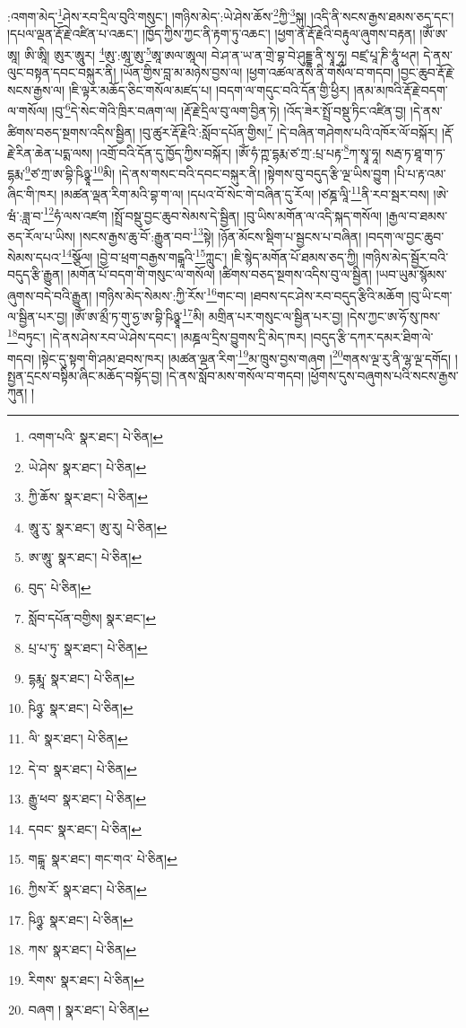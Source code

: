 :འགག་མེད་\footnote{འགག་པའི་  སྣར་ཐང་།  པེ་ཅིན། }ཤེས་རབ་དྲིལ་བུའི་གསུང་། །གཉིས་མེད་:ཡེ་ཤེས་ཆོས་\footnote{ཡེ་ཤེས་  སྣར་ཐང་།  པེ་ཅིན། }ཀྱི་\footnote{ཀྱི་ཆོས་  སྣར་ཐང་།  པེ་ཅིན། }སྐུ། །འདི་ནི་སངས་རྒྱས་ཐམས་ཅད་དང་། །དཔལ་ལྡན་རྡོ་རྗེ་འཛིན་པ་འཆང་། །ཁྱོད་ཀྱིས་ཀྱང་ནི་རྟག་ཏུ་འཆང་། །ཕྱག་ན་རྡོ་རྗེའི་བརྟུལ་ཞུགས་བརྟན། །ཨོཾ་ཨ་ཨཱ། ཨི་ཨཱི། ཨུར་ཨཱུར། \footnote{ཨཱུ་རུ་  སྣར་ཐང་། ཨུ་རུ།   པེ་ཅིན། }ཨུ་:ཨཱ་ཨུ་\footnote{ཨ་ཨཱུ་  སྣར་ཐང་།  པེ་ཅིན། }ཨཱ་ཨལ་ཨཱལ། བེ་ཤ་ན་ཡ་ན་གྲེ་བྷ་བེ་ཤུདྡྷ་ནི་སྭཱ་ཧཱ། བཛྲ་པཱ་ཎི་ཧཱུཾ་ཕཊ། དེ་ནས་ལུང་བསྟན་དབང་བསྐུར་ནི། །ཡོན་གྱིས་བླ་མ་མཉེས་བྱས་ལ། །ཕྱག་འཚལ་ནས་ནི་གསོལ་བ་གདབ། །བྱང་ཆུབ་རྡོ་རྗེ་སངས་རྒྱས་ལ། །ཇི་ལྟར་མཆོད་ཅིང་གསོལ་མཛད་པ། །བདག་ལ་གདུང་བའི་དོན་གྱི་ཕྱིར། །ནམ་མཁའི་རྡོ་རྗེ་བདག་ལ་གསོལ། །བུ་\footnote{བུད་  པེ་ཅིན། }དེ་སེང་གེའི་ཁྲིར་བཞག་ལ། །རྡོ་རྗེ་དྲིལ་བུ་ལག་བྱིན་ཏེ། །འོད་ཟེར་སྤྲོ་བསྡུ་ཏིང་འཛིན་བྱ། །དེ་ནས་ཚིགས་བཅད་སྔགས་འདིས་སྦྱིན། །བུ་ཚུར་རྡོ་རྗེའི་:སློབ་དཔོན་གྱིས།\footnote{སློབ་དཔོན་བགྱིས།  སྣར་ཐང་། } །དེ་བཞིན་གཤེགས་པའི་འཁོར་ལོ་བསྐོར། །རྡོ་རྗེ་རིན་ཆེན་པདྨ་ལས། །འགྲོ་བའི་དོན་དུ་ཁྱོད་ཀྱིས་བསྐོར། །ཨོཾ་ཧཾ་ཀྵ་དྷརྨ་ཙ་ཀྲ་:པྲ་པརྟ་\footnote{པྲ་པ་ཏུ་  སྣར་ཐང་།  པེ་ཅིན། }ཀ་སྭཱ་ཧཱ། སརྦ་ཏ་ཐཱ་ག་ཏ་དྷརྨ་\footnote{དྷརྨཱ་  སྣར་ཐང་།  པེ་ཅིན། }ཙ་ཀྲ་ཨ་བྷི་ཥིཉྩཱ་\footnote{ཥིཉྩ་  སྣར་ཐང་།  པེ་ཅིན། }མི། །དེ་ནས་གསང་བའི་དབང་བསྐུར་ནི། །སྟེགས་བུ་བདུད་རྩི་ལྔ་ཡིས་བྱུག །པི་པ་རྟ་འམ་ཞིང་གི་ཁར། །མཚན་ལྡན་རིག་མའི་བྷ་ག་ལ། །དཔའ་བོ་སེང་གེ་བཞིན་དུ་རོལ། །ཙཎྜ་ལཱི་\footnote{ལི་  སྣར་ཐང་།  པེ་ཅིན། }ནི་རབ་སྦར་བས། །ཨེ་ཝཾ་:ཟླ་བ་\footnote{དེ་བ་  སྣར་ཐང་།  པེ་ཅིན། }ཧཾ་ལས་འཛག །སྤྲོ་བསྡུ་བྱང་ཆུབ་སེམས་དེ་སྦྱིན། །བུ་ཡིས་མགོན་ལ་འདི་སྐད་གསོལ། །རྒྱལ་བ་ཐམས་ཅད་རོལ་པ་ཡིས། །སངས་རྒྱས་ཆུ་བོ་:རྒྱུན་བབ་\footnote{རྒྱུ་ཕབ་  སྣར་ཐང་།  པེ་ཅིན། }སྟེ། །ཉོན་མོངས་སྡིག་པ་སྦྱངས་པ་བཞིན། །བདག་ལ་བྱང་ཆུབ་སེམས་དཔའ་\footnote{དབང་  སྣར་ཐང་།  པེ་ཅིན། }སྩོལ། །བྱེ་བ་ཕྲག་བརྒྱས་གངྒཱའི་\footnote{གངྒཱ་  སྣར་ཐང་། གང་གའ་  པེ་ཅིན། }ཀླུང་། །ཇི་སྙེད་མགོན་པོ་ཐམས་ཅད་ཀྱི། །གཉིས་མེད་སྦྱོར་བའི་བདུད་རྩི་རྒྱུན། །མགོན་པོ་བདག་གི་གསུང་ལ་གསོལ། །ཚིགས་བཅད་སྔགས་འདིས་བུ་ལ་སྦྱིན། །ཡབ་ཡུམ་སྙོམས་ཞུགས་བདེ་བའི་རྒྱུན། །གཉིས་མེད་སེམས་:ཀྱི་རོས་\footnote{ཀྱིས་རོ་  སྣར་ཐང་།  པེ་ཅིན། }གང་བ། །ཐབས་དང་ཤེས་རབ་བདུད་རྩིའི་མཆོག །བུ་ཡི་ངག་ལ་སྦྱིན་པར་བྱ། །ཨོཾ་ཨ་མྲྀ་ཏ་གུ་ཧྱ་ཨ་བྷི་ཥིཉྩཱ་\footnote{ཥིཉྩ་  སྣར་ཐང་།  པེ་ཅིན། }མི། མགྲིན་པར་གསུང་ལ་སྦྱིན་པར་བྱ། །དེས་ཀྱང་ཨ་ཧོ་སུ་ཁས་\footnote{ཀས་  སྣར་ཐང་།  པེ་ཅིན། }བཏུང་། །དེ་ནས་ཤེས་རབ་ཡེ་ཤེས་དབང་། །མཎྜལ་དྲིས་བྱུགས་དྲི་མེད་ཁར། །བདུད་རྩི་དཀར་དམར་ཐིག་ལེ་གདབ། །སྟེང་དུ་སྟག་གི་ཤམ་ཐབས་ཁར། །མཚན་ལྡན་རིག་\footnote{རིགས་  སྣར་ཐང་།  པེ་ཅིན། }མ་ཁྲུས་བྱས་གཞག །\footnote{བཞག །  སྣར་ཐང་།  པེ་ཅིན། }གནས་ལྔ་རུ་ནི་ལྷ་ལྔ་དགོད། །སྤྱན་དྲངས་བསྟིམ་ཞིང་མཆོད་བསྟོད་བྱ། །དེ་ནས་སློབ་མས་གསོལ་བ་གདབ། །ཕྱོགས་དུས་བཞུགས་པའི་སངས་རྒྱས་ཀུན། །
